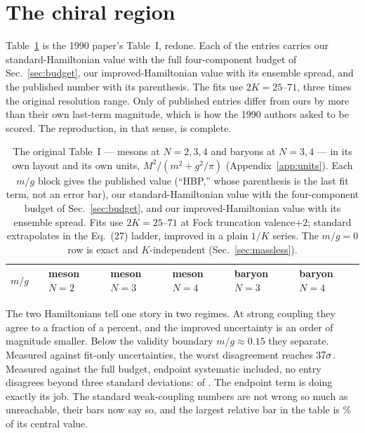 \section{The chiral region}
\label{sec:chiral}

Table~\ref{tab:tableone} is the 1990 paper's Table~I, redone.  Each of the
\numTableoneNEntries{} entries carries our standard-Hamiltonian value with
the full four-component budget of Sec.~\ref{sec:budget}, our
improved-Hamiltonian value with its ensemble spread, and the published
number with its parenthesis.  The fits use $2K = 25$--$71$, three times the
original resolution range.  Only \numTableoneNOutsidePaperTerm{} of
\numTableoneNEntries{} published entries differ from ours by more than
their own last-term magnitude, which is how the 1990 authors asked to be
scored.  The reproduction, in that sense, is complete.

\begin{table}
\caption{The original Table~I --- mesons at $N=2,3,4$ and baryons at $N=3,4$ --- in its own layout and its own units,
$M^2/(m^2+g^2/\pi)$ (Appendix~\ref{app:units}).  Each $m/g$ block gives the
published value (``HBP,'' whose parenthesis is the last fit term, not an
error bar), our standard-Hamiltonian value with the four-component budget of
Sec.~\ref{sec:budget}, and our improved-Hamiltonian value with its ensemble
spread.  Fits use $2K = 25$--$71$ at Fock truncation valence$+2$; standard
extrapolates in the Eq.~(27) ladder, improved in a plain $1/K$ series.  The
$m/g = 0$ row is exact and $K$-independent (Sec.~\ref{sec:massless}).}
\label{tab:tableone}
\begin{ruledtabular}
\begin{tabular}{lllllll}
$m/g$ & & meson $N{=}2$ & meson $N{=}3$ & meson $N{=}4$
      & baryon $N{=}3$ & baryon $N{=}4$ \\
\hline

\end{tabular}
\end{ruledtabular}
\end{table}

The two Hamiltonians tell one story in two regimes.  At strong coupling
they agree to a fraction of a percent, and the improved uncertainty is an
order of magnitude smaller.  Below the validity boundary
$m/g \approx 0.15$ they separate.  Measured against fit-only uncertainties,
the worst disagreement reaches
$37\sigma$.  Measured against the full
budget, endpoint systematic included, no entry disagrees beyond three
standard deviations: \numTableoneImprovedNBeyondThreeSigma{} of
\numTableoneNEntries.  The endpoint term is doing exactly its job.  The
standard weak-coupling numbers are not wrong so much as unreachable, their
bars now say so, and the largest relative bar in the table is
\numTableoneWorstWeakBarPct\% of its central value.

